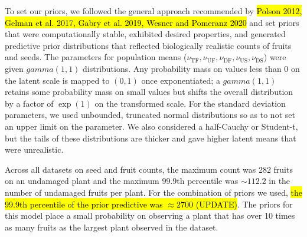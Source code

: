 \documentclass[12pt, oneside, titlepage]{article}   	%
\begin{document}
To set our priors, we followed the general approach recommended by \hl{Polson 2012, Gelman et al. 2017, Gabry et al. 2019, Wesner and Pomeranz 2020} and set priors that were computationally stable, exhibited desired properties, and generated predictive prior distributions that reflected biologically realistic counts of fruits and seeds. The parameters for population means ($\nu_\mathrm{TF},\nu_\mathrm{UF},\nu_\mathrm{DF},\nu_\mathrm{US},\nu_\mathrm{DS}$) were given $gamma(1,1)$ distributions. Any probability mass on values less than 0 on the latent scale is mapped to $(0,1)$ once exponentiated; a $gamma(1,1)$ retains some probability mass on small values but shifts the overall distribution by a factor of $\exp(1)$ on the transformed scale. For the standard deviation parameters, we used unbounded, truncated normal distributions so as to not set an upper limit on the parameter. We also considered a half-Cauchy or Student-t, but the tails of these distributions are thicker and gave higher latent means that were unrealistic.

Across all datasets on seed and fruit counts, the maximum count was 282 fruits on an undamaged plant and the maximum 99.9th percentile was $\sim112.2$ in the number of undamaged fruits per plant. For the combination of priors we used, \hl{the 99.9th percentile of the prior predictive was $\approx 2700$ (UPDATE)}. The priors for this model place a small probability on observing a plant that has over 10 times as many fruits as the largest plant observed in the dataset. 


\end{document}
